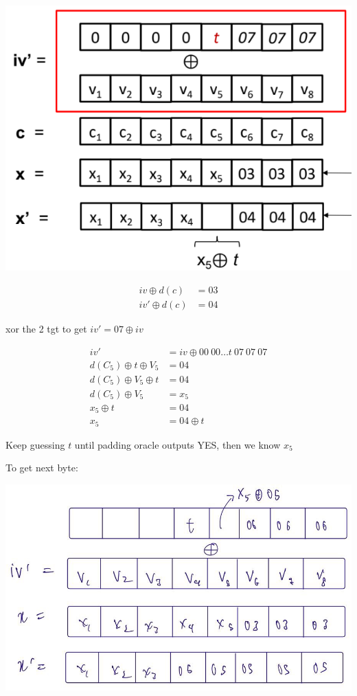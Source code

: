 \documentclass[landscape,a4paper]{extarticle}
\newenvironment{Figure}
  {\par\noindent\minipage{\linewidth}}
  {\endminipage\par\medskip}
\begin{document}
\begin{multicols*}{5}
    \begin{Figure}
        \centering
        \includegraphics[width=\linewidth]{padding_oracle_attack.png}
    \end{Figure}

    \begin{align*}
        iv \oplus d(c) &= 03\\
        iv' \oplus d(c) &= 04
    \end{align*}

    xor the 2 tgt to get $iv' = 07 \oplus iv$

    \begin{align*}
        iv' &= iv \oplus 00\ 00 \ldots t\ 07\ 07\ 07\\
        d(C_5) \oplus t \oplus V_5 &= 04\\
        d(C_5) \oplus V_5 \oplus t &= 04\\
        d(C_5) \oplus V_5 &= x_5\\
        x_5 \oplus t &= 04\\
        x_5 &= 04 \oplus t
    \end{align*}
    
    Keep guessing $t$ until padding oracle outputs YES, then we know $x_5$

    To get next byte:
    \begin{Figure}
        \centering
        \includegraphics[width=\linewidth]{padding_oracle_next_byte.jpg}
    \end{Figure} 


\end{multicols*}
\end{document}
